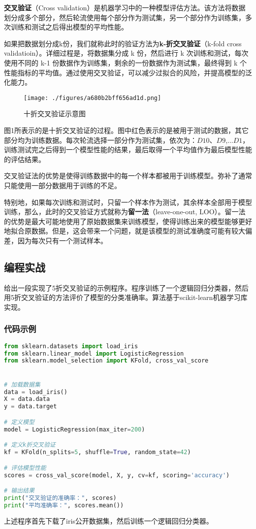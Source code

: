 


\textbf{交叉验证}（Cross validation）是机器学习中的一种模型评估方法。该方法将数据划分成多个部分，然后轮流使用每个部分作为测试集，另一个部分作为训练集，多次训练和测试之后得出模型的平均性能。

如果把数据划分成k份，我们就称此时的验证方法为\textbf{k-折交叉验证}（k-fold cross validatioin）。详细过程是，将数据集分成 k 份，然后进行 k 次训练和测试，每次使用不同的 k-1 份数据作为训练集，剩余的一份数据作为测试集，最终得到 k 个性能指标的平均值。通过使用交叉验证，可以减少过拟合的风险，并提高模型的泛化能力。

\begin{figure}[ht]
\centering
\texttt{[image: ./figures/a680b2bff656ad1d.png]}
\caption{十折交叉验证示意图} \label{fig_CroVal_1}
\end{figure}
图1所表示的是十折交叉验证的过程。图中红色表示的是被用于测试的数据，其它部分均为训练数据。每次轮流选择一部分作为测试集，依次为：$D10$、$D9$,...$D1$，训练测试完之后得到一个模型性能的结果，最后取得一个平均值作为最后模型性能的评估结果。

交叉验证法的优势是使得训练数据中的每一个样本都被用于训练模型。弥补了通常只能使用一部分数据用于训练的不足。

特别地，如果每次训练和测试时，只留一个样本作为测试，其余样本全部用于模型训练，那么，此时的交叉验证方式就称为\textbf{留一法}（leave-one-out, LOO）。留一法的优势是最大可能地使用了原始数据集来训练模型，使得训练出来的模型能够更好地拟合原数据。但是，这会带来一个问题，就是该模型的测试准确度可能有较大偏差，因为每次只有一个测试样本。


\subsection{编程实战}

给出一段实现了5折交叉验证的示例程序。程序训练了一个逻辑回归分类器，然后用5折交叉验证的方法评价了模型的分类准确率。算法基于scikit-learn机器学习库实现。

\subsubsection{代码示例}
\begin{lstlisting}[language=python]
from sklearn.datasets import load_iris
from sklearn.linear_model import LogisticRegression
from sklearn.model_selection import KFold, cross_val_score


# 加载数据集
data = load_iris()
X = data.data
y = data.target

# 定义模型
model = LogisticRegression(max_iter=200)

# 定义k折交叉验证
kf = KFold(n_splits=5, shuffle=True, random_state=42)

# 评估模型性能
scores = cross_val_score(model, X, y, cv=kf, scoring='accuracy')

# 输出结果
print("交叉验证的准确率：", scores)
print("平均准确率：", scores.mean())
\end{lstlisting}
上述程序首先下载了iris公开数据集，然后训练一个逻辑回归分类器。

